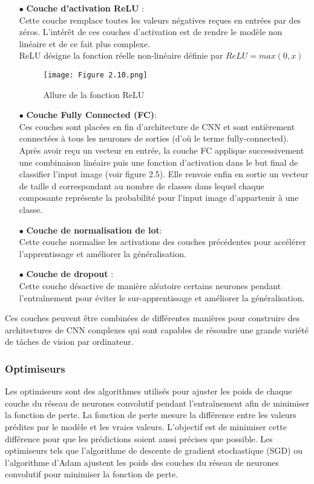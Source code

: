 \begin{itemize}
\newpage
    \item [$\bullet$]\textbf{Couche d’activation ReLU }:\\
  Cette couche remplace toutes les valeurs négatives reçues en entrées par des zéros. L’intérêt de ces couches d’activation est de rendre le modèle non linéaire et de ce fait plus complexe.\\
ReLU désigne la fonction réelle non-linéaire définie par 
$ReLU = max(0,x)$
\begin{figure}[!h]
  \centering
  \texttt{[image: Figure 2.10.png]}
  \caption{Allure de la fonction ReLU }
  \label{fig:Allure de la fonction ReLU}
\end{figure}

\vspace{0.5em}
    \item [$\bullet$]\textbf{Couche Fully Connected (FC)}:\\
Ces couches sont placées en fin d’architecture de CNN et sont entièrement connectées à tous les neurones de sorties (d’où le terme fully-connected). Après avoir reçu un vecteur en entrée, la couche FC applique successivement une combinaison linéaire puis une fonction d’activation dans le but final de classifier l’input image (voir figure 2.5). Elle renvoie enfin en sortie un vecteur de taille d correspondant au nombre de classes dans lequel chaque composante représente la probabilité pour l’input image d’appartenir à une classe.

\vspace{0.5em}
    \item [$\bullet$]\textbf{Couche de normalisation de lot}:\\
Cette couche normalise les activations des couches précédentes pour accélérer l'apprentissage et améliorer la généralisation.
\vspace{0.5em}
    \item [$\bullet$]\textbf{Couche de dropout }:\\
Cette couche désactive de manière aléatoire certains neurones pendant l'entraînement pour éviter le sur-apprentissage et améliorer la généralisation.
\end{itemize}
\vspace{0.5cm}
Ces couches peuvent être combinées de différentes manières pour construire des architectures de CNN complexes qui sont capables de résoudre une grande variété de tâches de vision par ordinateur.

\subsubsection{Optimiseurs}
Les optimiseurs sont des algorithmes utilisés pour ajuster les poids de chaque couche du réseau de neurones convolutif pendant l'entraînement afin de minimiser la fonction de perte.
La fonction de perte mesure la différence entre les valeurs prédites par le modèle et les vraies valeurs. L'objectif est de minimiser cette différence pour que les prédictions soient aussi précises que possible. Les optimiseurs tels que l'algorithme de descente de gradient stochastique (SGD) ou l'algorithme d'Adam ajustent les poids des couches du réseau de neurones convolutif pour minimiser la fonction de perte.

